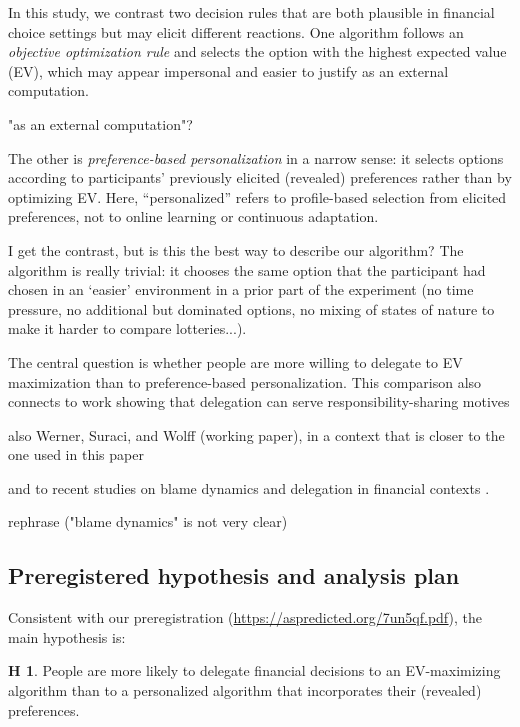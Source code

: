 \documentclass[a4paper, 12pt, fleqn]{article}
\theoremstyle{definition}
\newtheorem{hyp}{H}
\begin{document}
In this study, we contrast two decision rules that are both plausible in financial choice settings but may elicit different reactions. One algorithm follows an \emph{objective optimization rule} and selects the option with the highest expected value (EV), which may appear impersonal and easier to justify as an external computation. 
\begin{icomm}
	"as an external computation"?
\end{icomm}
The other is \emph{preference-based personalization} in a narrow sense: it selects options according to participants' previously elicited (revealed) preferences rather than by optimizing EV. Here, ``personalized'' refers to profile-based selection from elicited preferences, not to online learning or continuous adaptation. 
\begin{icomm}
	I get the contrast, but is this the best way to describe our algorithm? The algorithm is really trivial: it chooses the same option that the participant had chosen in an `easier' environment in a prior part of the experiment (no time pressure, no additional but dominated options, no mixing of states of nature to make it harder to compare lotteries...).
\end{icomm}
The central question is whether people are more willing to delegate to EV maximization than to preference-based personalization. This comparison also connects to work showing that delegation can serve responsibility-sharing motives \citep{Kirchkamp2019} 
\begin{icomm}
	also Werner, Suraci, and Wolff (working paper), in a context that is closer to the one used in this paper
\end{icomm}
and to recent studies on blame dynamics and delegation in financial contexts \citep{Ismagilova2025}.
\begin{icomm}
	rephrase ("blame dynamics" is not very clear)
\end{icomm}

\subsection*{Preregistered hypothesis and analysis plan}
Consistent with our preregistration ({\footnotesize\url{https://aspredicted.org/7un5qf.pdf}}), the main hypothesis is: 
\begin{hyp}
	People are more likely to delegate financial decisions to an EV-maximizing algorithm than to a personalized algorithm that incorporates their (revealed) preferences.
\end{hyp}
\end{document}
